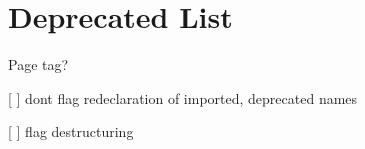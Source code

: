 \chapter{Deprecated List}
\hypertarget{deprecated}{}\label{deprecated}

\begin{DoxyRefList}
\item[Page \doxylink{md_pkiclassroomrescheduler_2src_2main_2frontend_2node__modules_2eslint-plugin-import_2docs_2rules_2no-deprecated}{import/no-\/deprecated} ]\label{deprecated__deprecated000001}%
%
tag?
\begin{DoxyItemize}
\item \mbox{[} \mbox{]} don\textquotesingle{}t flag redeclaration of imported, deprecated names
\item \mbox{[} \mbox{]} flag destructuring 
\end{DoxyItemize}
\end{DoxyRefList}